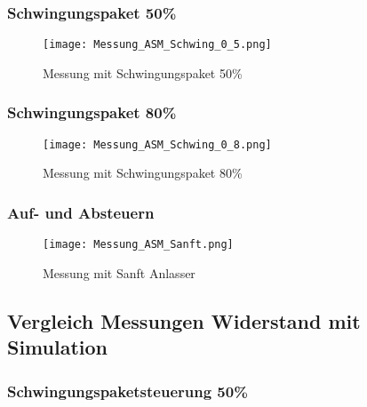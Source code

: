 \begin{appendix}
\subsubsection*{Schwingungspaket 50\%}
\begin{figure}[ht!]
	\centering
	\texttt{[image: Messung\_ASM\_Schwing\_0\_5.png]}	
	\caption{Messung mit Schwingungspaket 50\%}\label{fig:Mess_ASM_Schwing_0_5}
\end{figure}

\newpage
\subsubsection*{Schwingungspaket 80\%}
\begin{figure}[ht!]
	\centering
	\texttt{[image: Messung\_ASM\_Schwing\_0\_8.png]}	
	\caption{Messung mit Schwingungspaket 80\%}\label{fig:Mess_ASM_Schwing_0_8}
\end{figure}

\newpage
\subsubsection*{Auf- und Absteuern}
\begin{figure}[ht!]
	\centering
	\texttt{[image: Messung\_ASM\_Sanft.png]}	
	\caption{Messung mit Sanft Anlasser}\label{fig:Mess_ASM_Sanft}
\end{figure}

\newpage
\subsection{Vergleich Messungen Widerstand mit Simulation}
\subsubsection*{Schwingungspaketsteuerung 50\%} \label{sec:Vergleich_Mess_Sim_Schwing_50}


\end{appendix}
